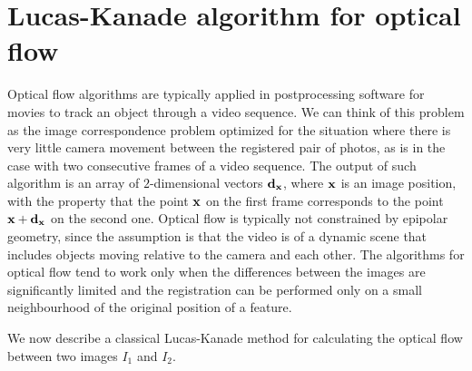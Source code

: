 


\section{Lucas-Kanade algorithm for optical flow} 

Optical flow algorithms are typically applied in postprocessing software for movies to track an object through a video sequence. 
We can think of this problem as the image correspondence problem optimized for the situation where there is very little camera movement between the registered pair of photos, as is in the case with two consecutive frames of a video sequence. 
The output of such algorithm is an array of $2$-dimensional vectors $\mathbf{d}_{\mathbf{x}}$, where $\mathbf{x}$ is an image position, with the property that the point $\mathbf{x}$ on the first frame corresponds to the point $\mathbf{x} + \mathbf{d}_{\mathbf{x}}$ on the second one. 
Optical flow is typically not constrained by epipolar geometry, since the assumption is that the video is of a dynamic scene that includes objects moving relative to the camera and each other.
The algorithms for optical flow tend to work only when the differences between the images are significantly limited and the registration can be performed only on a small neighbourhood of the original position of a feature. 

We now describe a classical Lucas-Kanade method \cite{lucas} for calculating the optical flow between two images $I_1$ and $I_2$.

